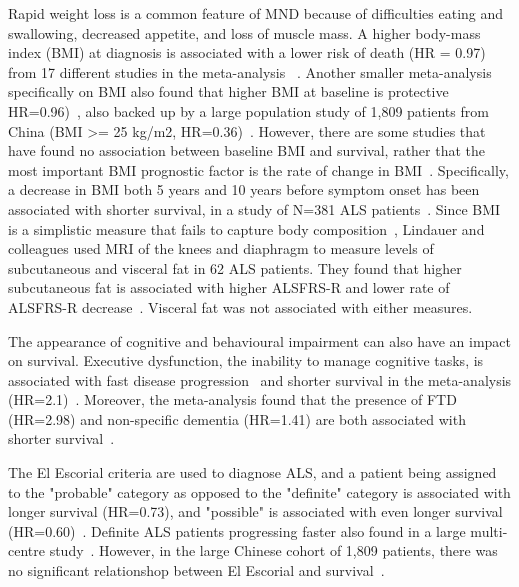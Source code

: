 Rapid weight loss is a common feature of MND because of difficulties eating and swallowing, decreased appetite, and loss of muscle mass. A higher body-mass index (BMI) at diagnosis is associated with a lower risk of death (HR = 0.97) from 17 different studies in the meta-analysis ~\cite{suPredictorsSurvivalPatients2021}.
Another smaller meta-analysis specifically on BMI also found that higher BMI at baseline is protective HR=0.96)~\cite{dardiotisBodyMassIndex2018}, also backed up by a large population study of 1,809 patients from China (BMI >= 25 kg/m2, HR=0.36)~\cite{gaoEpidemiologyFactorsPredicting2021}.
However, there are some studies that have found no association between baseline BMI and survival, rather that the most important BMI prognostic factor is the rate of change in BMI~\cite{jawaidDecreaseBodyMass2010}.
Specifically, a decrease in BMI both 5 years and 10 years before symptom onset has been associated with shorter survival, in a study of N=381 ALS patients~\cite{goutmanBodyMassIndex2023}.
Since BMI is a simplistic measure that fails to capture body composition~\cite{rothmanBMIrelatedErrorsMeasurement2008}, Lindauer and colleagues used MRI of the knees and diaphragm to measure levels of subcutaneous and visceral fat in 62 ALS patients.
They found that higher subcutaneous fat is associated with higher ALSFRS-R and lower rate of ALSFRS-R decrease~\cite{lindauerAdiposeTissueDistribution2013}. Visceral fat was not associated with either measures.

The appearance of cognitive and behavioural impairment can also have an impact on survival.
Executive dysfunction, the inability to manage cognitive tasks, is associated with fast disease progression~\cite{elaminExecutiveDysfunctionNegative2011} and shorter survival in the meta-analysis (HR=2.1)~\cite{suPredictorsSurvivalPatients2021}.
Moreover, the meta-analysis found that the presence of FTD (HR=2.98) and non-specific dementia (HR=1.41) are both associated with shorter survival~\cite{suPredictorsSurvivalPatients2021}.

The El Escorial criteria are used to diagnose ALS, and a patient being assigned to the "probable" category as opposed to the "definite" category is associated with longer survival (HR=0.73), and "possible" is associated with even longer survival (HR=0.60)~\cite{suPredictorsSurvivalPatients2021}.
Definite ALS patients progressing faster also found in a large multi-centre study~\cite{westenengPrognosisPatientsAmyotrophic2018}. However, in the large Chinese cohort of 1,809 patients, there was no significant relationshop between El Escorial and survival~\cite{gaoEpidemiologyFactorsPredicting2021}.

